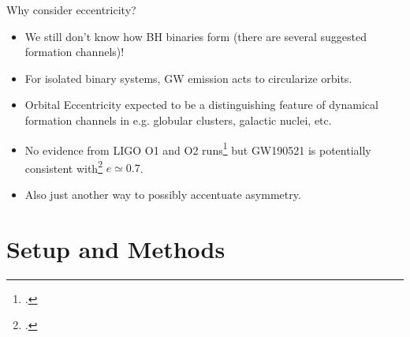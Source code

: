 \documentclass[smaller,aspectratio=169]{beamer}
\begin{document}
\begin{frame}{Why consider eccentricity?}
    \begin{itemize}
        \item 
            We still don't know how BH binaries form 
            (there are several suggested \alert{formation channels})!
        \item
            For \alert{isolated binary} systems, GW emission acts to 
            circularize orbits.
        \item
            Orbital Eccentricity expected to be a distinguishing feature of 
            \alert{dynamical} formation channels in e.g. globular 
            clusters, galactic nuclei, etc.
        \item
            No evidence from LIGO O1 and O2 runs\footcite{Salemi:2019owp} 
            but GW190521 is potentially consistent with\footcite{Gayathri:2020coq} 
            $e\simeq0.7$.
        \item
            Also just another way to possibly accentuate asymmetry.
    \end{itemize}
\end{frame}

\section{Setup and Methods}
\end{document}
